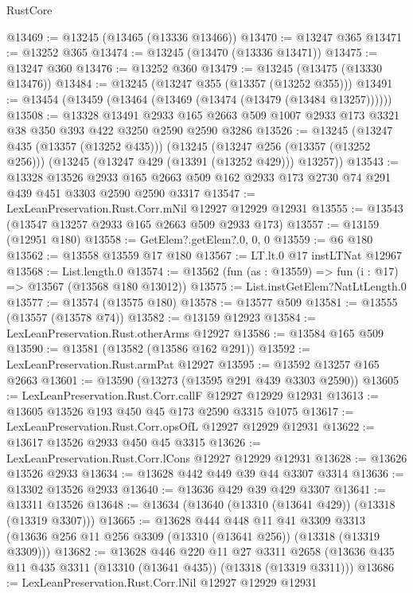 \begin{lexlean}{RustCore}
\begin{coremodule}
@13469 := @13245 (@13465 (@13336 @13466))
@13470 := @13247 @365
@13471 := @13252 @365
@13474 := @13245 (@13470 (@13336 @13471))
@13475 := @13247 @360
@13476 := @13252 @360
@13479 := @13245 (@13475 (@13330 @13476))
@13484 := @13245 (@13247 @355 (@13357 (@13252 @355)))
@13491 := @13454 (@13459 (@13464 (@13469 (@13474 (@13479 (@13484 @13257))))))
@13508 := @13328
    @13491
    @2933
    @165
    @2663
    @509
    @1007
    @2933
    @173
    @3321
    @38
    @350
    @393
    @422
    @3250
    @2590
    @2590
    @3286
@13526 := @13245
    (@13247 @435 (@13357 (@13252 @435)))
    (@13245
      (@13247 @256 (@13357 (@13252 @256)))
      (@13245 (@13247 @429 (@13391 (@13252 @429))) @13257))
@13543 := @13328
    @13526
    @2933
    @165
    @2663
    @509
    @162
    @2933
    @173
    @2730
    @74
    @291
    @439
    @451
    @3303
    @2590
    @2590
    @3317
@13547 := LexLeanPreservation.Rust.Corr.mNil @12927 @12929 @12931
@13555 := @13543 (@13547 @13257 @2933 @165 @2663 @509 @2933 @173)
@13557 := @13159 (@12951 @180)
@13558 := GetElem?.getElem?.{0, 0, 0}
@13559 := @6 @180
@13562 := @13558 @13559 @17 @180
@13567 := LT.lt.{0} @17 instLTNat @12967
@13568 := List.length.{0}
@13574 := @13562 (fun (as : @13559) => fun (i : @17) => @13567 (@13568 @180 @13012))
@13575 := List.instGetElem?NatLtLength.{0}
@13577 := @13574 (@13575 @180)
@13578 := @13577 @509
@13581 := @13555 (@13557 (@13578 @74))
@13582 := @13159 @12923
@13584 := LexLeanPreservation.Rust.otherArms @12927
@13586 := @13584 @165 @509
@13590 := @13581 (@13582 (@13586 @162 @291))
@13592 := LexLeanPreservation.Rust.armPat @12927
@13595 := @13592 @13257 @165 @2663
@13601 := @13590 (@13273 (@13595 @291 @439 @3303 @2590))
@13605 := LexLeanPreservation.Rust.Corr.callF @12927 @12929 @12931
@13613 := @13605 @13526 @193 @450 @45 @173 @2590 @3315 @1075
@13617 := LexLeanPreservation.Rust.Corr.opsOfL @12927 @12929 @12931
@13622 := @13617 @13526 @2933 @450 @45 @3315
@13626 := LexLeanPreservation.Rust.Corr.lCons @12927 @12929 @12931
@13628 := @13626 @13526 @2933
@13634 := @13628 @442 @449 @39 @44 @3307 @3314
@13636 := @13302 @13526 @2933
@13640 := @13636 @429 @39 @429 @3307
@13641 := @13311 @13526
@13648 := @13634 (@13640 (@13310 (@13641 @429)) (@13318 (@13319 @3307)))
@13665 := @13628
    @444
    @448
    @11
    @41
    @3309
    @3313
    (@13636 @256 @11 @256 @3309 (@13310 (@13641 @256)) (@13318 (@13319 @3309)))
@13682 := @13628
    @446
    @220
    @11
    @27
    @3311
    @2658
    (@13636 @435 @11 @435 @3311 (@13310 (@13641 @435)) (@13318 (@13319 @3311)))
@13686 := LexLeanPreservation.Rust.Corr.lNil @12927 @12929 @12931

\end{coremodule}
\end{lexlean}
